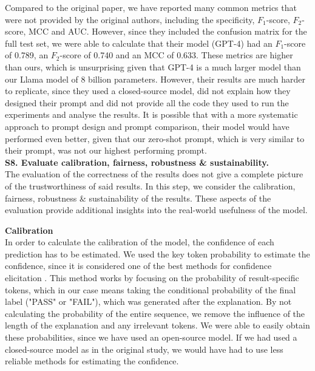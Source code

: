 \documentclass[a4paper]{article}
\begin{document}
Compared to the original paper, we have reported many common metrics that were not provided by the original authors, including the specificity, $F_1$-score, $F_2$-score, MCC and AUC. However, since they included the confusion matrix for the full test set, we were able to calculate that their model (GPT-4) had an $F_1$-score of 0.789, an $F_2$-score of 0.740 and an MCC of 0.633. These metrics are higher than ours, which is unsurprising given that GPT-4 is a much larger model than our Llama model of 8 billion parameters. However, their results are much harder to replicate, since they used a closed-source model, did not explain how they designed their prompt and did not provide all the code they used to run the experiments and analyse the results. It is possible that with a more systematic approach to prompt design and prompt comparison, their model would have performed even better, given that our zero-shot prompt, which is very similar to their prompt, was not our highest performing prompt.\\

\textbf{S8. Evaluate calibration, fairness, robustness \& sustainability.}\\
The evaluation of the correctness of the results does not give a complete picture of the trustworthiness of said results. In this step, we consider the calibration, fairness, robustness \& sustainability of the results. These aspects of the evaluation provide additional insights into the real-world usefulness of the model. 

\textbf{Calibration}\\
In order to calculate the calibration of the model, the confidence of each prediction has to be estimated. We used the key token probability to estimate the confidence, since it is considered one of the best methods for confidence elicitation \cite{xiong2024confidence}. This method works by focusing on the probability of result-specific tokens, which in our case means taking the conditional probability of the final label ("PASS" or "FAIL"), which was generated after the explanation. By not calculating the probability of the entire sequence, we remove the influence of the length of the explanation and any irrelevant tokens. We were able to easily obtain these probabilities, since we have used an open-source model. If we had used a closed-source model as in the original study, we would have had to use less reliable methods for estimating the confidence. 
\end{document}
